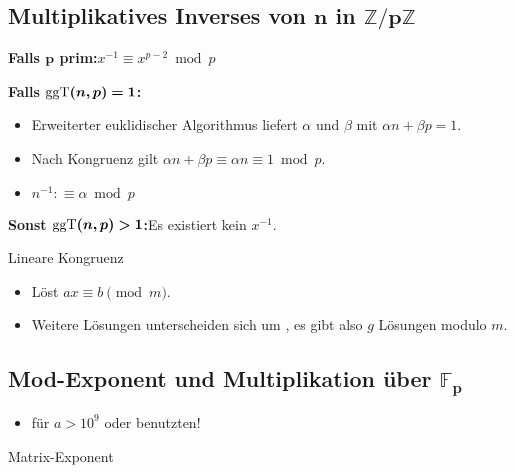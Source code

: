 \subsection{Multiplikatives Inverses von $\boldsymbol{n}$ in $\boldsymbol{\mathbb{Z}/p\mathbb{Z}}$}
\textbf{Falls $\boldsymbol{p}$ prim:}\quad $x^{-1} \equiv x^{p-2} \bmod p$

\textbf{Falls $\boldsymbol{\text{ggT}(n, p) = 1}$:}
\begin{itemize}
	\item Erweiterter euklidischer Algorithmus liefert $\alpha$ und $\beta$ mit
	$\alpha n + \beta p = 1$.
	\item Nach Kongruenz gilt $\alpha n + \beta p \equiv \alpha n \equiv 1 \bmod p$.
	\item $n^{-1} :\equiv \alpha \bmod p$
	\end{itemize}
\textbf{Sonst $\boldsymbol{\text{ggT}(n, p) > 1}$:}\quad Es existiert kein $x^{-1}$.

\begin{algorithm}{Lineare Kongruenz}
	\begin{itemize}
		\item Löst $ax\equiv b\pmod{m}$.
		\item Weitere Lösungen unterscheiden sich um , es gibt
		also $g$ Lösungen modulo $m$.
	\end{itemize}
\end{algorithm}

\subsection{Mod-Exponent und Multiplikation über $\boldsymbol{\mathbb{F}_p}$}
\begin{itemize}
	\item für $a > 10^9$  oder  benutzten! 
\end{itemize}

\begin{algorithm}{Matrix-Exponent}
	\begin{methods}
	\end{methods}
\end{algorithm}

